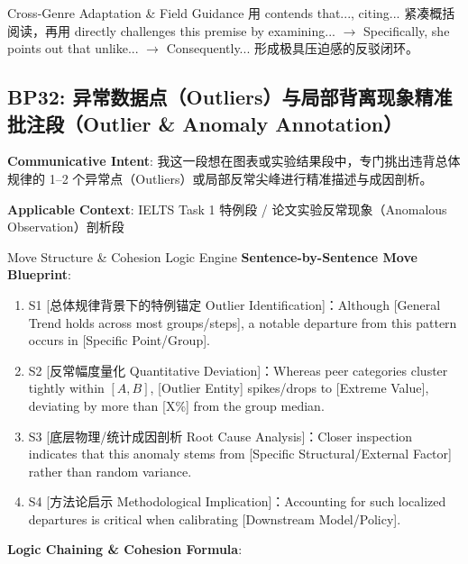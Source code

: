 \endgroup
\vspace{4pt}
\begin{TipBox}{Cross-Genre Adaptation \& Field Guidance}
用 contends that..., citing... 紧凑概括阅读，再用 directly challenges this premise by examining... $\to$ Specifically, she points out that unlike... $\to$ Consequently... 形成极具压迫感的反驳闭环。
\end{TipBox}
\vspace{8pt}
\subsection{BP32: 异常数据点（Outliers）与局部背离现象精准批注段（Outlier \& Anomaly Annotation）}\label{sec:bp:BP32}
\noindent\textbf{\color{AcadNavy}Communicative Intent}: 我这一段想在图表或实验结果段中，专门挑出违背总体规律的 1--2 个异常点（Outliers）或局部反常尖峰进行精准描述与成因剖析。\par\vspace{2pt}
\noindent\textbf{\color{AcadSlate}Applicable Context}: IELTS Task 1 特例段 / 论文实验反常现象（Anomalous Observation）剖析段\par\vspace{4pt}
\begin{ConceptBox}{Move Structure \& Cohesion Logic Engine}
\textbf{Sentence-by-Sentence Move Blueprint}:
\begin{enumerate}[label=\textbf{\color{AcadNavy}S\arabic*.}, leftmargin=2em, itemsep=2pt]
  \item S1 [总体规律背景下的特例锚定 Outlier Identification]：Although [General Trend holds across most groups/steps], a notable departure from this pattern occurs in [Specific Point/Group].
  \item S2 [反常幅度量化 Quantitative Deviation]：Whereas peer categories cluster tightly within $[A, B]$, [Outlier Entity] spikes/drops to [Extreme Value], deviating by more than [X\%] from the group median.
  \item S3 [底层物理/统计成因剖析 Root Cause Analysis]：Closer inspection indicates that this anomaly stems from [Specific Structural/External Factor] rather than random variance.
  \item S4 [方法论启示 Methodological Implication]：Accounting for such localized departures is critical when calibrating [Downstream Model/Policy].
\end{enumerate}\par\vspace{4pt}
\textbf{Logic Chaining \& Cohesion Formula}:\par{}
\end{ConceptBox}
